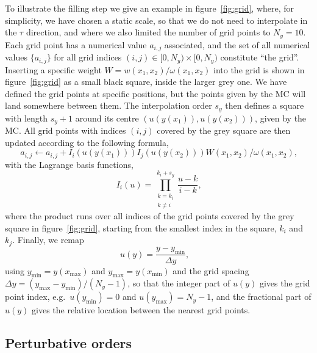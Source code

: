 To illustrate the filling step we give an example in figure~\ref{fig:grid}, where, for simplicity, we have chosen a static scale, so that we do not need to interpolate in the $\tau$ direction, and where we also limited the number of grid points to $N_y = 10$.
Each grid point has a numerical value $a_{i,j}$ associated, and the set of all numerical values $\{ a_{i,j} \}$ for all grid indices $(i,j) \in [0,N_y) \times [0,N_y)$ constitute \enquote{the grid}.
Inserting a specific weight $W = w (x_1, x_2) / \omega(x_1, x_2)$ into the grid is shown in figure~\ref{fig:grid} as a small black square, inside the larger grey one.
We have defined the grid points at specific positions, but the points given by the MC will land somewhere between them.
The interpolation order $s_y$ then defines a square with length $s_y + 1$ around its centre $(u(y(x_1)),u(y(x_2)))$, given by the MC.
All grid points with indices $(i,j)$ covered by the grey square are then updated according to the following formula,
\begin{equation}
a_{i,j} \leftarrow a_{i,j} + I_i(u(y(x_1))) I_j(u(y(x_2))) W(x_1,x_2) / \omega(x_1,x_2) \text{,}
\label{eq:interpolation}
\end{equation}
with the Lagrange basis functions,
\begin{equation}
I_i (u) = \prod_{\substack{k=k_i \\ k \neq i}}^{k_i + s_y} \frac{u-k}{i-k} \text{,}
\end{equation}
where the product runs over all indices of the grid points covered by the grey square in figure~\ref{fig:grid}, starting from the smallest index in the square, $k_i$ and $k_j$.
Finally, we remap
\begin{equation}
u(y) = \frac{y-y_\text{min}}{\Delta y} \text{,} \quad
\end{equation}
using $y_\text{min} = y(x_\text{max})$ and $y_\text{max} = y(x_\text{min})$ and the grid spacing $\Delta y = (y_\text{max} - y_\text{min})/(N_y-1)$, so that the integer part of $u(y)$ gives the grid point index, e.g.\ $u(y_\text{min}) = 0$ and $u(y_\text{max}) = N_y - 1$, and the fractional part of $u(y)$ gives the relative location between the nearest grid points.

\subsection{Perturbative orders}
\label{sec:perturbative-orders}

